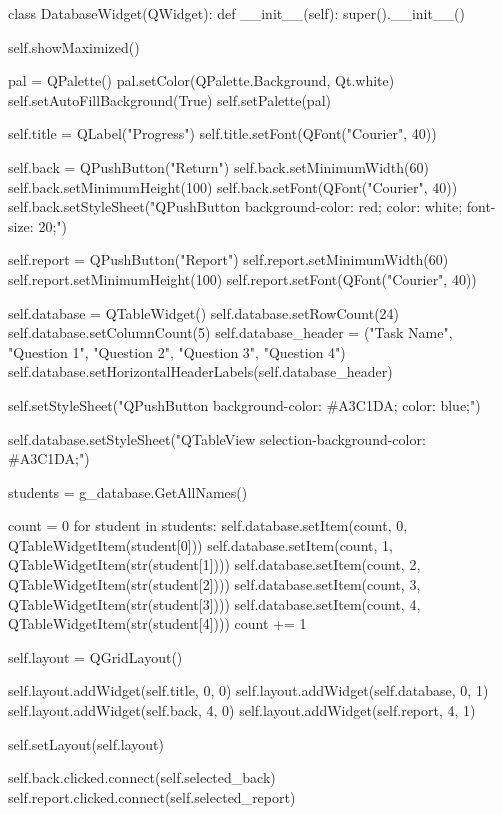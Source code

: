 \begin{python}
class DatabaseWidget(QWidget):
    def __init__(self):
        super().__init__()

        self.showMaximized()

        pal = QPalette()
        pal.setColor(QPalette.Background, Qt.white)
        self.setAutoFillBackground(True)
        self.setPalette(pal)

        self.title = QLabel("Progress")
        self.title.setFont(QFont("Courier", 40))

        self.back = QPushButton("Return")
        self.back.setMinimumWidth(60)
        self.back.setMinimumHeight(100)
        self.back.setFont(QFont("Courier", 40))
        self.back.setStyleSheet("QPushButton {background-color: red; color: white; font-size: 20;}")

        self.report = QPushButton("Report")
        self.report.setMinimumWidth(60)
        self.report.setMinimumHeight(100)
        self.report.setFont(QFont("Courier", 40))
        
        self.database = QTableWidget()
        self.database.setRowCount(24)
        self.database.setColumnCount(5)
        self.database_header = ("Task Name", "Question 1", "Question 2", "Question 3", "Question 4")
        self.database.setHorizontalHeaderLabels(self.database_header)

        self.setStyleSheet("QPushButton {background-color: #A3C1DA; color: blue;}")

        self.database.setStyleSheet("QTableView {selection-background-color: #A3C1DA;}")

        students = g_database.GetAllNames()
        
        count = 0
        for student in students:
            self.database.setItem(count, 0, QTableWidgetItem(student[0]))
            self.database.setItem(count, 1, QTableWidgetItem(str(student[1])))
            self.database.setItem(count, 2, QTableWidgetItem(str(student[2])))
            self.database.setItem(count, 3, QTableWidgetItem(str(student[3])))
            self.database.setItem(count, 4, QTableWidgetItem(str(student[4])))
            count += 1

        self.layout = QGridLayout()

        self.layout.addWidget(self.title, 0, 0) 
        self.layout.addWidget(self.database, 0, 1)
        self.layout.addWidget(self.back, 4, 0)
        self.layout.addWidget(self.report, 4, 1)

        self.setLayout(self.layout)

        self.back.clicked.connect(self.selected_back)
        self.report.clicked.connect(self.selected_report)
\end{python}

